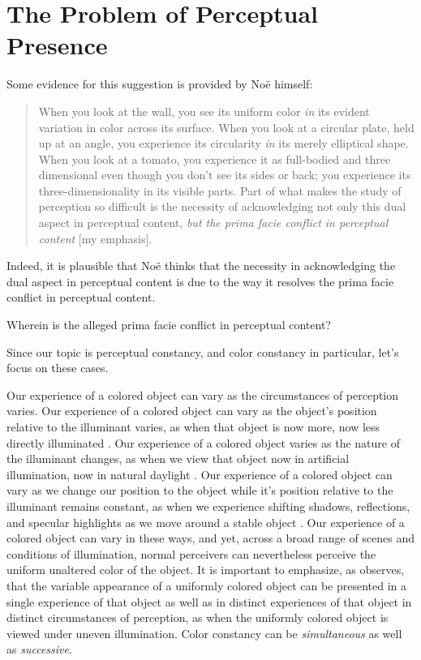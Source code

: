 \documentclass[12pt]{article}
\begin{document}

\section{The Problem of Perceptual Presence}\label{sec:conflicting_appearances} %

Some evidence for this suggestion is provided by Noë himself:
	\begin{quote}
		When you look at the wall, you see its uniform color \emph{in} its evident variation in color across its surface. When you look at a circular plate, held up at an angle, you experience its circularity \emph{in} its merely elliptical shape. When you look at a tomato, you experience it as full-bodied and three dimensional even though you don't see its sides or back; you experience its three-dimensionality in its visible parts. Part of what makes the study of perception so difficult is the necessity of acknowledging not only this dual aspect in perceptual content, \emph{but the prima facie conflict in perceptual content} [my emphasis]. \citep[166-167]{Noe:2004fk}
	\end{quote}
Indeed, it is plausible that Noë thinks that the necessity in acknowledging the dual aspect in perceptual content is due to the way it resolves the prima facie conflict in perceptual content.

Wherein is the alleged prima facie conflict in perceptual content?

Since our topic is perceptual constancy, and color constancy in particular, let's focus on these cases.

Our experience of a colored object can vary as the circumstances of perception varies. Our experience of a colored object can vary as the object's position relative to the illuminant varies, as when that object is now more, now less directly illuminated \citep[125]{Noe:2004fk}. Our experience of a colored object varies as the nature of the illuminant changes, as when we view that object now in artificial illumination, now in natural daylight \citep[125]{Noe:2004fk}. Our experience of a colored object can vary as we change our position to the object while it's position relative to the illuminant remains constant, as when we experience shifting shadows, reflections, and specular highlights as we move around a stable object \citep[125]{Noe:2004fk}. Our experience of a colored object can vary in these ways, and yet, across a broad range of scenes and conditions of illumination, normal perceivers can nevertheless perceive the uniform unaltered color of the object. It is important to emphasize, as \citet[62-63]{Cohen:2008hc} observes, that the variable appearance of a uniformly colored object can be presented in a single experience of that object as well as in distinct experiences of that object in distinct circumstances of perception, as when the uniformly colored object is viewed under uneven illumination. Color constancy can be \emph{simultaneous} as well as \emph{successive}.
\end{document}

